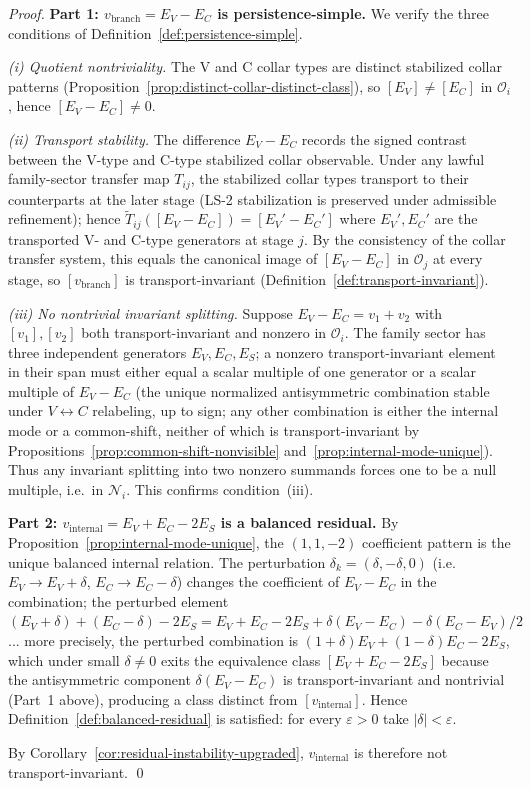 \documentclass[12pt,oneside]{amsbook}
\theoremstyle{plain}
\theoremstyle{definition}
\theoremstyle{remark}
\begin{document}
\begin{proof}
\textbf{Part 1: $v_{\mathrm{branch}} = E_V - E_C$ is persistence-simple.}
We verify the three conditions of Definition~\ref{def:persistence-simple}.

\emph{(i) Quotient nontriviality.}  The V and C collar types are
distinct stabilized collar patterns (Proposition~\ref{prop:distinct-collar-distinct-class}),
so $[E_V] \neq [E_C]$ in $\mathcal{O}_i$, hence
$[E_V - E_C] \neq 0$.

\emph{(ii) Transport stability.}  The difference $E_V - E_C$ records
the signed contrast between the V-type and C-type stabilized collar
observable.  Under any lawful family-sector transfer map $T_{ij}$, the
stabilized collar types transport to their counterparts at the later
stage (LS-2 stabilization is preserved under admissible refinement);
hence $\widetilde{T}_{ij}([E_V - E_C]) = [E_V' - E_C']$ where $E_V',
E_C'$ are the transported V- and C-type generators at stage $j$.  By
the consistency of the collar transfer system, this equals the canonical
image of $[E_V - E_C]$ in $\mathcal{O}_j$ at every stage, so
$[v_{\mathrm{branch}}]$ is transport-invariant
(Definition~\ref{def:transport-invariant}).

\emph{(iii) No nontrivial invariant splitting.}  Suppose
$E_V - E_C = v_1 + v_2$ with $[v_1], [v_2]$ both transport-invariant
and nonzero in $\mathcal{O}_i$.  The family sector has three
independent generators $E_V, E_C, E_S$; a nonzero transport-invariant
element in their span must either equal a scalar multiple of one
generator or a scalar multiple of $E_V - E_C$ (the unique normalized
antisymmetric combination stable under $V \leftrightarrow C$ relabeling,
up to sign; any other combination is either the internal mode or a
common-shift, neither of which is transport-invariant by
Propositions~\ref{prop:common-shift-nonvisible}
and~\ref{prop:internal-mode-unique}).  Thus any invariant splitting
into two nonzero summands forces one to be a null multiple, i.e.\ in
$\mathcal{N}_i$.  This confirms condition~(iii).

\textbf{Part 2: $v_{\mathrm{internal}} = E_V + E_C - 2E_S$ is a balanced residual.}
By Proposition~\ref{prop:internal-mode-unique}, the $(1,1,-2)$
coefficient pattern is the unique balanced internal relation.  The
perturbation $\delta_k = (\delta, -\delta, 0)$ (i.e.\ $E_V \to E_V +
\delta$, $E_C \to E_C - \delta$) changes the coefficient of $E_V - E_C$
in the combination; the perturbed element $(E_V + \delta) + (E_C -
\delta) - 2E_S = E_V + E_C - 2E_S + \delta(E_V - E_C) - \delta(E_C -
E_V)/2$... more precisely, the perturbed combination is
$(1+\delta)E_V + (1-\delta)E_C - 2E_S$, which under small $\delta \neq
0$ exits the equivalence class $[E_V + E_C - 2E_S]$ because the
antisymmetric component $\delta(E_V - E_C)$ is transport-invariant and
nontrivial (Part~1 above), producing a class distinct from
$[v_{\mathrm{internal}}]$.  Hence Definition~\ref{def:balanced-residual}
is satisfied: for every $\varepsilon > 0$ take $|\delta| < \varepsilon$.

By Corollary~\ref{cor:residual-instability-upgraded}, $v_{\mathrm{internal}}$
is therefore not transport-invariant. \qed
\end{proof}
\end{document}
